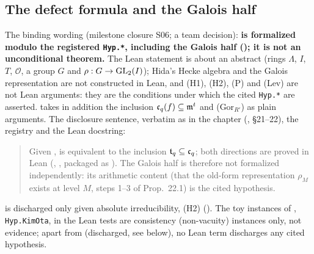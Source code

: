 \subsection{The defect formula and the Galois half}
The binding wording (milestone closure S06; a team decision): \textbf{ is formalized modulo the
registered \texttt{Hyp.*}, including the Galois half (); it is not an unconditional theorem.}
The Lean statement is about an abstract  (rings $\Lambda$, $I$, $T$, $\mathcal O$, a group $G$ and
$\rho:G\to\mathrm{GL}_2(I)$); Hida's Hecke algebra and the Galois representation are not constructed in Lean, and (H1), (H2), (P)
and (Lev) are not Lean arguments: they are the conditions under which the cited \texttt{Hyp.*} are asserted.
 takes in addition the inclusion $\mathfrak{c}_q(f)\subseteq\mathfrak{m}^t$ and (Gor$_{R'}$) as plain arguments.
The disclosure sentence, verbatim as in the chapter (\mainpdf, \S21--22), the registry and the Lean docstring:
\begin{quote}\small
Given ,  is equivalent to the inclusion $\mathfrak{t}_q\subseteq\mathfrak{c}_q$; both
directions are proved in Lean (, , packaged as
). The Galois half is therefore not formalized independently: its arithmetic content
(that the old-form representation $\rho_M$ exists at level $M$, steps 1--3 of Prop.~22.1) is the cited hypothesis.
\end{quote}
 is discharged only given absolute irreducibility, (H2)
(). The toy instances of , \texttt{Hyp.KimOta},
 in the Lean tests are consistency (non-vacuity) instances only, not evidence; apart from  (discharged, see
below), no Lean term discharges any cited hypothesis.

